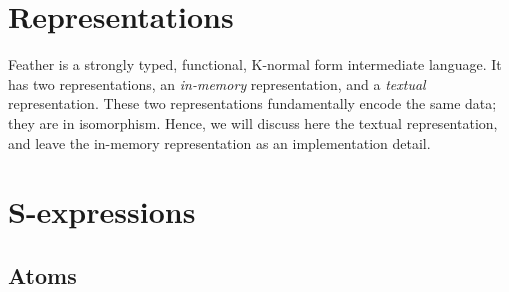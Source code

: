 \documentclass[UKenglish, 11pt, a4paper, parskip=half]{scrbook}
\begin{document}
\section{Representations}

Feather is a strongly typed, functional, K-normal form intermediate language. It has two representations, an \textit{in-memory} representation, and a \textit{textual} representation.
These two representations fundamentally encode the same data; they are in isomorphism.
Hence, we will discuss here the textual representation, and leave the in-memory representation as an implementation detail.

\section{S-expressions}

\subsection{Atoms}
\label{sec:prim_types}
\end{document}
